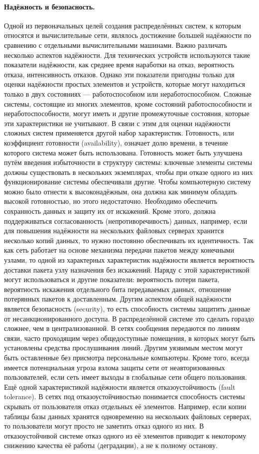 \documentclass[a4paper,12pt]{article}
\begin{document}
\paragraph{Надёжность и безопасность.}
Одной из первоначальных целей создания распределённых систем, к которым относятся и вычислительные сети, являлось достижение большей надёжности по сравнению с отдельными вычислительными машинами. Важно различать несколько аспектов надёжности. Для технических устройств используются такие показатели надёжности, как среднее время наработки на отказ, вероятность отказа, интенсивность отказов. Однако эти показатели пригодны только для оценки надёжности простых элементов и устройств, которые могут находиться только в двух состояниях — работоспособном или неработоспособном. Сложные системы, состоящие из многих элементов, кроме состояний работоспособности и неработоспособности, могут иметь и другие промежуточные состояния, которые эти характеристики не учитывают. В связи с этим для оценки надёжности сложных систем применяется другой набор характеристик. Готовность, или коэффициент готовности (availability), означает долю времени, в течение которого система может быть использована. Готовность может быть улучшена путём введения избыточности в структуру системы: ключевые элементы системы должны существовать в нескольких экземплярах, чтобы при отказе одного из них функционирование системы обеспечивали другие. Чтобы компьютерную систему можно было отнести к высоконадёжным, она должна как минимум обладать высокой готовностью, но этого недостаточно. Необходимо обеспечить сохранность данных и защиту их от искажений. Кроме этого, должна поддерживаться согласованность (непротиворечивость) данных, например, если для повышения надёжности на нескольких файловых серверах хранится несколько копий данных, то нужно постоянно обеспечивать их идентичность. Так как сеть работает на основе механизма передачи пакетов между конечными узлами, то одной из характерных характеристик надёжности является вероятность доставки пакета узлу назначения без искажений. Наряду с этой характеристикой могут использоваться и другие показатели: вероятность потери пакета, вероятность искажения отдельного бита передаваемых данных, отношение потерянных пакетов к доставленным. Другим аспектом общей надёжности является безопасность (security), то есть способность системы защитить данные от несанкционированного доступа. В распределённой системе это сделать гораздо сложнее, чем в централизованной. В сетях сообщения передаются по линиям связи, часто проходящим через общедоступные помещения, в которых могут быть установлены средства прослушивания линий. Другим уязвимым местом могут быть оставленные без присмотра персональные компьютеры. Кроме того, всегда имеется потенциальная угроза взлома защиты сети от неавторизованных пользователей, если сеть имеет выходы в глобальные сети общего пользования. Ещё одной характеристикой надёжности является отказоустойчивость (fault tolerance). В сетях под отказоустойчивостью понимается способность системы скрывать от пользователя отказ отдельных её элементов. Например, если копии таблицы базы данных хранятся одновременно на нескольких файловых серверах, то пользователи могут просто не заметить отказ одного из них. В отказоустойчивой системе отказ одного из её элементов приводит к некоторому снижению качества её работы (деградации), а не к полному останову.
\end{document}
